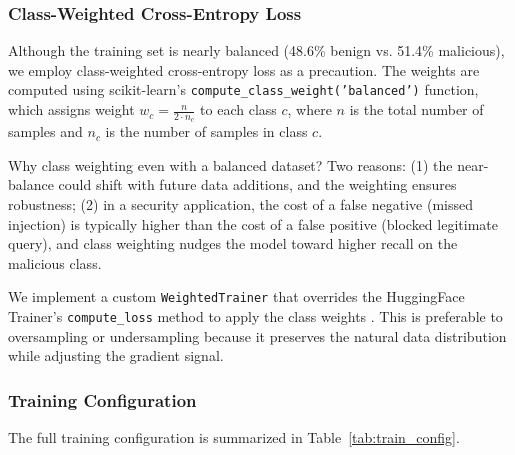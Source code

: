 \documentclass[12pt, letterpaper]{article}   %
\begin{document}
\subsubsection{Class-Weighted Cross-Entropy Loss}

Although the training set is nearly balanced (48.6\% benign vs. 51.4\% malicious), we employ class-weighted cross-entropy loss as a precaution. The weights are computed using scikit-learn's \texttt{compute\_class\_weight('balanced')} function, which assigns weight $w_c = \frac{n}{2 \cdot n_c}$ to each class $c$, where $n$ is the total number of samples and $n_c$ is the number of samples in class $c$.

Why class weighting even with a balanced dataset? Two reasons: (1) the near-balance could shift with future data additions, and the weighting ensures robustness; (2) in a security application, the cost of a false negative (missed injection) is typically higher than the cost of a false positive (blocked legitimate query), and class weighting nudges the model toward higher recall on the malicious class.

We implement a custom \texttt{WeightedTrainer} that overrides the HuggingFace Trainer's \texttt{compute\_loss} method to apply the class weights \cite{ref37}. This is preferable to oversampling or undersampling because it preserves the natural data distribution while adjusting the gradient signal.

\subsubsection{Training Configuration}

The full training configuration is summarized in Table~\ref{tab:train_config}.
\end{document}
